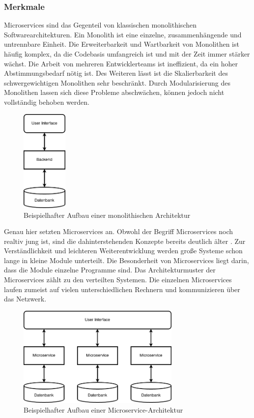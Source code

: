 \subsubsection{Merkmale}
Microservices sind das Gegenteil von klassischen monolithischen Softwarearchitekturen. Ein Monolith ist eine einzelne, zusammenhängende und untrennbare Einheit. Die Erweiterbarkeit und Wartbarkeit von Monolithen ist häufig komplex, da die Codebasis umfangreich ist und mit der Zeit immer stärker wächst. Die Arbeit von mehreren Entwicklerteams ist ineffizient, da ein hoher Abstimmungsbedarf nötig ist. Des Weiteren lässt ist die Skalierbarkeit des schwergewichtigen Monolithen sehr beschränkt. Durch Modularisierung des Monolithen lassen sich diese Probleme abschwächen, können jedoch nicht vollständig behoben werden.

\begin{figure}[H] 
    \centering
    \includegraphics[width=0.2\textwidth]{figures/AufbauMonolith.png}
    \caption{Beispielhafter Aufbau einer monolithischen Architektur}
\end{figure}

Genau hier setzten Microservices an. Obwohl der Begriff Microservices noch realtiv jung ist, sind die dahinterstehenden Konzepte bereits deutlich älter \parencite[vgl.][S. 15]{newmanMicroservices2015}. Zur Verständlichkeit und leichteren Weiterentwicklung werden große Systeme schon lange in kleine Module unterteilt. Die Besonderheit von Microservices liegt darin, dass die Module einzelne Programme sind. Das Architekturmuster der Microservices zählt zu den verteilten Systemen. Die einzelnen Microservices laufen zumeist auf vielen unterschiedlichen Rechnern und kommunizieren über das Netzwerk.

\begin{figure}[H] 
    \centering
    \includegraphics[width=0.71\textwidth]{figures/AufbauMicroservices.png}
    \caption{Beispielhafter Aufbau einer Microservice-Architektur}
\end{figure}

